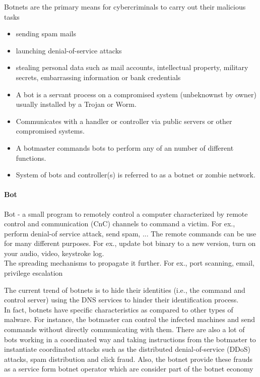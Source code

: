 Botnets are the primary means for cybercriminals to carry out their malicious tasks
\begin{itemize}
\item sending spam mails
\item launching denial-of-service attacks
\item stealing personal data such as mail accounts, intellectual property, military secrets, embarrassing information or bank credentials
\item A bot is a servant process on a compromised system (unbeknownst by owner) usually installed by a Trojan or Worm.
\item Communicates with a handler or controller via public servers or other compromised systems. 
\item A botmaster commands bots to perform any of an number of different functions.
\item System of bots and controller(s) is referred to as a botnet or zombie network.
\end{itemize}


\paragraph{Bot}
Bot - a small program to remotely control a computer characterized by remote control and communication (CnC) channels to command a victim. For ex., perform denial-of service attack, send spam, ... The remote commands can be use for many different purposes. For ex., update bot binary to a new version, turn on your audio, video, keystroke log. \\The spreading mechanisms to propagate it further. For ex., port scanning, email, privilege escalation

The current trend of botnets is to hide their identities (i.e., the command and control server) using the DNS services to hinder their identification process.\\
In fact, botnets have specific characteristics as compared to other types of malware. For instance, the botmaster can control the infected machines and send commands without directly communicating with them. There are also a lot of bots working in a coordinated way and taking instructions from the botmaster to instantiate coordinated attacks such as the distributed denial-of-service
(DDoS) attacks, spam distribution and click fraud. %
Also, the botnet provide these frauds as a service form botnet operator which are consider part of the botnet economy

